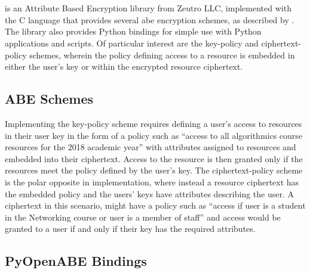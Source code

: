 \section{\OpenABE}
\label{sec:bkgr_openabe}

\OpenABE is an Attribute Based Encryption library from Zeutro LLC, implemented with the C language that provides several \acrshort{abe} encryption schemes, as described by \citet{Akinyele2011}. The library also provides Python bindings for simple use with Python applications and scripts. Of particular interest are the key-policy and ciphertext-policy schemes, wherein the policy defining access to a resource is embedded in either the user's key or within the encrypted resource ciphertext.

\subsection{ABE Schemes}
\label{subsec:bkgr_openabe_schemes}

Implementing the key-policy scheme requires defining a user's access to resources in their user key in the form of a policy such as ``access to all algorithmics course resources for the 2018 academic year'' with attributes assigned to resources and embedded into their ciphertext. Access to the resource is then granted only if the resources meet the policy defined by the user's key. The ciphertext-policy scheme is the polar opposite in implementation, where instead a resource ciphertext has the embedded policy and the users' keys have attributes describing the user. A ciphertext in this scenario, might have a policy such as ``access if user is a student in the Networking course or user is a member of staff'' and access would be granted to a user if and only if their key has the required attributes.

\subsection{PyOpenABE Bindings}
\label{subsec:bkgr_pyopenabe}


